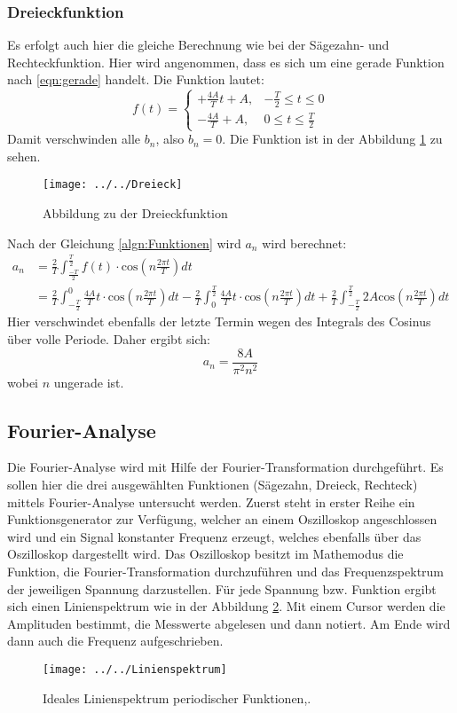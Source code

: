 \subsubsection{Dreieckfunktion}
Es erfolgt auch hier die gleiche Berechnung wie bei der Sägezahn- und Rechteckfunktion. Hier wird angenommen, dass es sich um eine gerade Funktion nach \ref{eqn:gerade} handelt.
Die Funktion lautet:
\begin{equation*}
f(t) =
\begin{cases}
+\frac{4A}{T}t+A , & -\frac{T}{2} \le t \le 0 \\
-\frac{4A}{T}+A , & 0 \le t \le \frac{T}{2}
\end{cases}
\end{equation*}
Damit verschwinden alle $b_{n}$, also $b_{n} = 0$. Die Funktion ist in der Abbildung \ref{fig:dreieck} zu sehen.
\begin{figure}[htb]
	\centering
	\texttt{[image: ../../Dreieck]}
	\caption{Abbildung zu der Dreieckfunktion}
	\label{fig:dreieck}
\end{figure}
Nach der Gleichung \ref{algn:Funktionen} wird $a_{n}$ wird berechnet:
\begin{align*}
a_{n} &= \frac{2}{T} \int_{\frac{-T}{2}}^{\frac{T}{2}} f(t) \cdot \text{cos}\left(n \frac{2\pi t}{T} \right) dt \\
&= \frac{2}{T} \int_{-\frac{T}{2}}^{0} \frac{4A}{T}t  \cdot \text{cos}\left(n \frac{2\pi t}{T} \right) dt - \frac{2}{T} \int_{0}^{\frac{T}{2}} \frac{4A}{T}t \cdot \text{cos}\left(n \frac{2\pi t}{T} \right) dt + \frac{2}{T} \int_{-\frac{T}{2}}^{\frac{T}{2}} 2A\text{cos}\left(n \frac{2\pi t}{T} \right) dt 
\end{align*}
Hier verschwindet ebenfalls der letzte Termin wegen des Integrals des Cosinus über volle Periode. 
Daher ergibt sich:
\begin{equation}
a_{n} = \frac{8A}{\pi^2 n^2}
\end{equation}
wobei $n$ ungerade ist. 
\subsection{Fourier-Analyse}
Die Fourier-Analyse wird mit Hilfe der Fourier-Transformation durchgeführt. Es sollen hier die drei ausgewählten Funktionen (Sägezahn, Dreieck, Rechteck) mittels Fourier-Analyse untersucht werden. Zuerst steht in erster Reihe ein Funktionsgenerator zur Verfügung, welcher an einem Oszilloskop angeschlossen wird und ein Signal konstanter Frequenz erzeugt, welches ebenfalls über das Oszilloskop dargestellt wird. 
Das Oszilloskop besitzt im Mathemodus die Funktion, die Fourier-Transformation durchzuführen und das Frequenzspektrum der jeweiligen Spannung darzustellen. Für jede Spannung bzw. Funktion ergibt sich einen Linienspektrum wie in der Abbildung \ref{fig:linienspektrum}. Mit einem Cursor werden die Amplituden bestimmt, die Messwerte abgelesen und dann notiert. Am Ende wird dann auch die Frequenz aufgeschrieben.
\begin{figure}[htb]
	\centering
	\texttt{[image: ../../Linienspektrum]}
	\caption{Ideales Linienspektrum periodischer Funktionen,\cite[1]{anleitung351}.}
	\label{fig:linienspektrum}
\end{figure}
